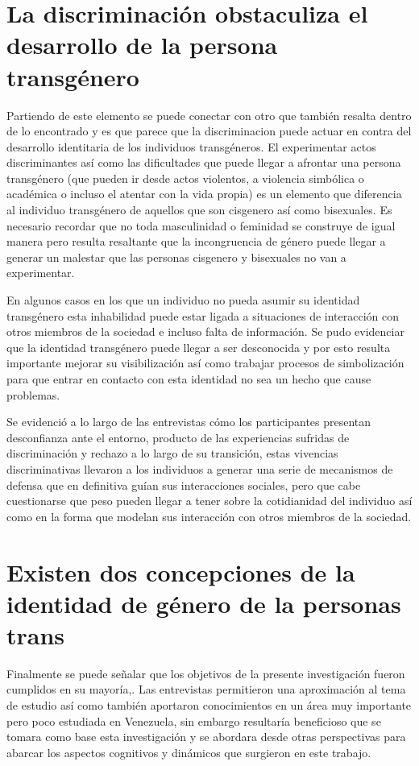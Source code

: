 \section{La discriminación obstaculiza el desarrollo de la persona transgénero}

Partiendo de este elemento se puede conectar con otro que también resalta dentro
de lo encontrado y es que parece que la discriminacion puede actuar en contra
del desarrollo identitaria de los individuos transgéneros. El experimentar actos
discriminantes así como las dificultades que puede llegar a afrontar una persona
transgénero (que pueden ir desde actos violentos, a violencia simbólica o
académica o incluso el atentar con la vida propia) es un elemento que diferencia
al individuo transgénero de aquellos que son cisgenero así como bisexuales. Es
necesario recordar que no toda masculinidad o feminidad se construye de igual
manera pero resulta resaltante que la incongruencia de género puede llegar a
generar un malestar que las personas cisgenero y bisexuales no van a
experimentar.

En algunos casos en los que un individuo no pueda asumir su identidad
transgénero esta inhabilidad puede estar ligada a situaciones de interacción
con otros miembros de la sociedad e incluso falta de información. Se pudo
evidenciar que la identidad transgénero puede llegar a ser desconocida y por
esto resulta importante mejorar su visibilización así como trabajar procesos de
simbolización para que entrar en contacto con esta identidad no sea un hecho que
cause problemas.

Se evidenció a lo largo de las entrevistas cómo los participantes presentan
desconfianza ante el entorno, producto de las experiencias sufridas de
discriminación y rechazo a lo largo de su transición, estas vivencias
discriminativas llevaron a los individuos a generar una serie de mecanismos de
defensa que en definitiva guían sus interacciones sociales, pero que cabe
cuestionarse que peso pueden llegar a tener sobre la cotidianidad del individuo
así como en la forma que modelan sus interacción con otros miembros de la
sociedad.

\section[Dos concepciones de la identidad]{Existen dos concepciones de la
identidad de género de la personas trans}

Finalmente se puede señalar que los objetivos de la presente investigación
fueron cumplidos en su mayoría,. Las entrevistas permitieron una aproximación al
tema de estudio así como también aportaron conocimientos en un área muy
importante pero poco estudiada en Venezuela, sin embargo resultaría beneficioso
que se tomara como base esta investigación y se abordara desde otras
perspectivas para abarcar los aspectos cognitivos y dinámicos que surgieron en
este trabajo.


